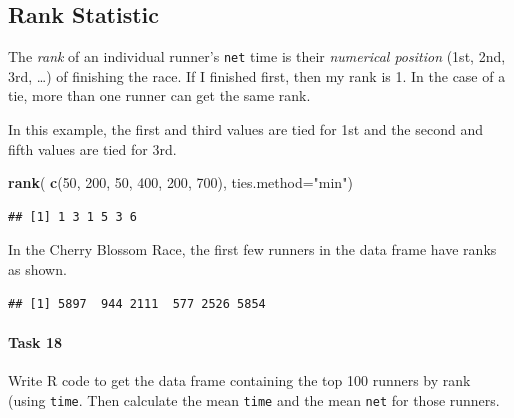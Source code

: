 \documentclass[
]{article}
\newenvironment{Shaded}{\begin{snugshade}}{\end{snugshade}}
\newcommand{\AttributeTok}[1]{\textcolor[rgb]{0.13,0.29,0.53}{#1}}
\newcommand{\DecValTok}[1]{\textcolor[rgb]{0.00,0.00,0.81}{#1}}
\newcommand{\FunctionTok}[1]{\textcolor[rgb]{0.13,0.29,0.53}{\textbf{#1}}}
\newcommand{\NormalTok}[1]{#1}
\newcommand{\SpecialCharTok}[1]{\textcolor[rgb]{0.81,0.36,0.00}{\textbf{#1}}}
\newcommand{\StringTok}[1]{\textcolor[rgb]{0.31,0.60,0.02}{#1}}
\begin{document}
\subsection{Rank Statistic}\label{rank-statistic}

The \emph{rank} of an individual runner's \texttt{net} time is their
\emph{numerical position} (1st, 2nd, 3rd, \ldots) of finishing the race.
If I finished first, then my rank is 1. In the case of a tie, more than
one runner can get the same rank.

In this example, the first and third values are tied for 1st and the
second and fifth values are tied for 3rd.

\begin{Shaded}
\begin{Highlighting}[]
\FunctionTok{rank}\NormalTok{( }\FunctionTok{c}\NormalTok{(}\DecValTok{50}\NormalTok{, }\DecValTok{200}\NormalTok{, }\DecValTok{50}\NormalTok{, }\DecValTok{400}\NormalTok{, }\DecValTok{200}\NormalTok{, }\DecValTok{700}\NormalTok{), }\AttributeTok{ties.method=}\StringTok{"min"}\NormalTok{)}
\end{Highlighting}
\end{Shaded}

\begin{verbatim}
## [1] 1 3 1 5 3 6
\end{verbatim}

In the Cherry Blossom Race, the first few runners in the data frame have
ranks as shown.

\begin{Shaded}
\end{Shaded}

\begin{verbatim}
## [1] 5897  944 2111  577 2526 5854
\end{verbatim}

\paragraph{Task 18}\label{task-18}

Write R code to get the data frame containing the top 100 runners by
rank (using \texttt{time}. Then calculate the mean \texttt{time} and the
mean \texttt{net} for those runners.
\end{document}

